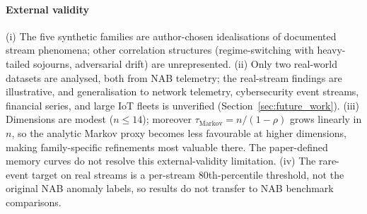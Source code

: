 \documentclass[sensors,article,submit,pdftex,moreauthors]{Definitions/mdpi}
\providecommand{\DIFadd}[1]{{\protect\color{blue}#1}} %
\providecommand{\DIFdel}[1]{} %
\providecommand{\DIFaddbegin}{} %
\providecommand{\DIFaddend}{} %
\providecommand{\DIFdelbegin}{} %
\providecommand{\DIFdelend}{} %
\begin{document}
\paragraph{\DIFadd{External validity}} \DIFadd{(i) The five synthetic families are author-chosen idealisations of documented stream phenomena; other correlation structures (regime-switching with heavy-tailed sojourns, adversarial drift) are unrepresented. (ii) Only two real-world datasets are analysed, both from NAB telemetry; the }\DIFaddend real-stream \DIFdelbegin \DIFdel{validation across financial, network-traffic, and additional sensor domains remains future work. }%
\textbf{\DIFdel{Modest dimensions.}} %
\DIFdel{Computation is tractable only to $n \leq 14$; compelling memory gaps are expected at $n \geq 20$ per the polynomial-in-$N$ classical bounds, for which $\Omega(\sqrt{N})$ is our conservative reference }\DIFdelend \DIFaddbegin \DIFadd{findings are illustrative, and generalisation to network telemetry, cybersecurity event streams, financial series, and large IoT fleets is unverified }\DIFaddend (Section~\DIFdelbegin \DIFdel{\ref{sec:heuristic_model}). The }\DIFdelend \DIFaddbegin \DIFadd{\ref{sec:future_work}). (iii) Dimensions are modest ($n \leq 14$); moreover $\tau_{\text{Markov}} = n/(1-\rho)$ grows linearly in $n$, so the analytic }\DIFaddend Markov proxy becomes less favourable at higher \DIFdelbegin \DIFdel{$n$ because $\tau_{\text{Markov}} = n/(1-\rho)$ grows linearly}\DIFdelend \DIFaddbegin \DIFadd{dimensions}\DIFaddend , making family-specific refinements \DIFdelbegin \DIFdel{especially }\DIFdelend \DIFaddbegin \DIFadd{most }\DIFaddend valuable there. \DIFdelbegin %
\textbf{\DIFdel{Task-specific lower bounds.}} %
\DIFdel{The $\Omega(\sqrt{N})$ floor is representative, not universal; exact hardness results in the originating framework are task-specific.
}%
\DIFdelend \DIFaddbegin \DIFadd{The paper-defined memory curves do not resolve this external-validity limitation. (iv) The rare-event target on real streams is a per-stream 80th-percentile threshold, not the original NAB anomaly labels, so results do not transfer to NAB benchmark comparisons.
}\DIFaddend 
\end{document}
